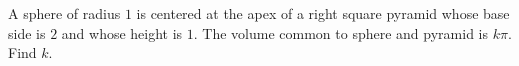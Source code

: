 A sphere of radius $1$ is centered at the apex of a right square pyramid whose base side is $2$ and whose height is $1$. The volume common to sphere and pyramid is $k\pi$. Find $k$.
